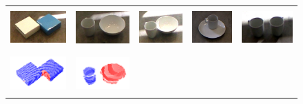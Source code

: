 \begin{figure}[h!]
\begin{tabular}{ccccc}
    \includegraphics[height=1.5cm]{pictures/82.jpg}&
    \includegraphics[height=1.5cm]{pictures/92.jpg}&     
    \includegraphics[height=1.5cm]{pictures/102.jpg}&
    \includegraphics[height=1.5cm]{pictures/112.jpg}&
    \includegraphics[height=1.5cm]{pictures/122.jpg}\\
    \includegraphics[height=1.5cm]{pictures/83.png}&
    \includegraphics[height=1.5cm]{pictures/93.png}&

\end{tabular}
\end{figure}
